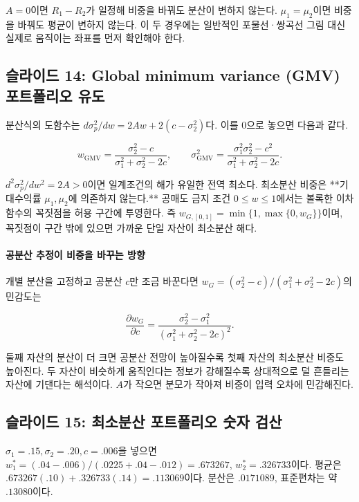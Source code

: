 \documentclass[11pt,a4paper]{article}
\begin{document}
$A=0$이면 $R_1-R_2$가 일정해 비중을 바꿔도 분산이 변하지 않는다. $\mu_1=\mu_2$이면 비중을 바꿔도 평균이 변하지 않는다. 이 두 경우에는 일반적인 포물선·쌍곡선 그림 대신 실제로 움직이는 좌표를 먼저 확인해야 한다.
\par

\subsection{슬라이드 14: Global minimum variance (GMV) 포트폴리오 유도}

분산식의 도함수는 $d\sigma_p^2/dw=2Aw+2(c-\sigma_2^2)$다. 이를 0으로 놓으면 다음과 같다.
\par

\[
w_{\mathrm{GMV}}=\frac{\sigma_2^2-c}{\sigma_1^2+\sigma_2^2-2c},\qquad
\sigma_{\mathrm{GMV}}^2=\frac{\sigma_1^2\sigma_2^2-c^2}{\sigma_1^2+\sigma_2^2-2c}.
\]

$d^2\sigma_p^2/dw^2=2A>0$이면 일계조건의 해가 유일한 전역 최소다. 최소분산 비중은 **기대수익률 $\mu_1,\mu_2$에 의존하지 않는다.** 공매도 금지 조건 $0\le w\le1$에서는 볼록한 이차함수의 꼭짓점을 허용 구간에 투영한다. 즉 $w_{G,[0,1]}=\min\{1,\max\{0,w_G\}\}$이며, 꼭짓점이 구간 밖에 있으면 가까운 단일 자산이 최소분산 해다.
\par

\paragraph{공분산 추정이 비중을 바꾸는 방향}

개별 분산을 고정하고 공분산 $c$만 조금 바꾼다면 $w_G=(\sigma_2^2-c)/(\sigma_1^2+\sigma_2^2-2c)$의 민감도는
\par

\[
\frac{\partial w_G}{\partial c}
=\frac{\sigma_2^2-\sigma_1^2}
{(\sigma_1^2+\sigma_2^2-2c)^2}.
\]

둘째 자산의 분산이 더 크면 공분산 전망이 높아질수록 첫째 자산의 최소분산 비중도 높아진다. 두 자산이 비슷하게 움직인다는 정보가 강해질수록 상대적으로 덜 흔들리는 자산에 기댄다는 해석이다. $A$가 작으면 분모가 작아져 비중이 입력 오차에 민감해진다.
\par

\subsection{슬라이드 15: 최소분산 포트폴리오 숫자 검산}

$\sigma_1=.15,\sigma_2=.20,c=.006$을 넣으면 $w_1^*=(.04-.006)/(.0225+.04-.012)=.673267$, $w_2^*=.326733$이다. 평균은 $.673267(.10)+.326733(.14)=.113069$이다. 분산은 $.0171089$, 표준편차는 약 $.13080$이다.
\par
\end{document}
